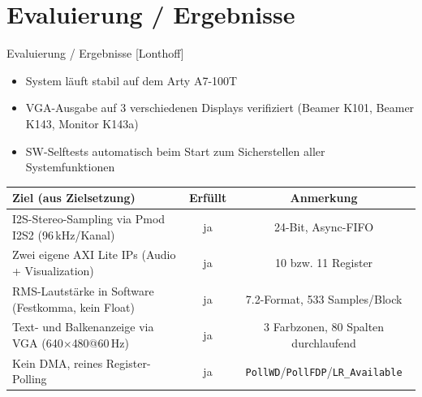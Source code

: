 \section{Evaluierung / Ergebnisse}
\begin{frame}{Evaluierung / Ergebnisse [Lonthoff]}
    \begin{itemize}
        \item System läuft stabil auf dem Arty A7-100T
        \item VGA-Ausgabe auf 3 verschiedenen Displays verifiziert (Beamer K101, Beamer K143, Monitor K143a)
        \item SW-Selftests automatisch beim Start zum Sicherstellen aller Systemfunktionen
    \end{itemize}

    \vspace{0.2em}
    \begin{table}
        \centering
        \footnotesize
        \begin{tabularx}{\textwidth}{Xcc}
            \toprule
            \textbf{Ziel (aus Zielsetzung)} & \textbf{Erfüllt} & \textbf{Anmerkung} \\
            \midrule
            I2S-Stereo-Sampling via Pmod I2S2 (96\,kHz/Kanal) & ja & 24-Bit, Async-FIFO \\
            Zwei eigene AXI Lite IPs (Audio + Visualization) & ja & 10 bzw. 11 Register \\
            RMS-Lautstärke in Software (Festkomma, kein Float) & ja & 7.2-Format, 533 Samples/Block \\
            Text- und Balkenanzeige via VGA (640$\times$480@60\,Hz) & ja & 3 Farbzonen, 80 Spalten durchlaufend \\
            Kein DMA, reines Register-Polling & ja & \texttt{PollWD}/\texttt{PollFDP}/\texttt{L\/R\_Available} \\
            \bottomrule
        \end{tabularx}
    \end{table}
\end{frame}